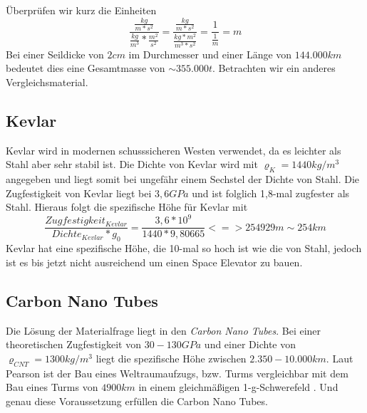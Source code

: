 \documentclass[a4paper, 10pt]{report}
\begin{document}
Überprüfen wir kurz die Einheiten
\begin{equation}
\frac{\frac{kg}{m*s^2}}{\frac{kg}{m^3}*\frac{m^2}{s^2}}= \frac{\frac{kg}{m*s^2}}{\frac{kg*m^2}{m^3*s^2}} = \frac{1}{\frac{1}{m}} = m
\end{equation}
Bei einer Seildicke von $2 cm$ im Durchmesser und einer Länge von $144.000 km$ bedeutet dies eine Gesamtmasse von $\sim 355.000 t$.\cite{PE75}
Betrachten wir ein anderes Vergleichsmaterial.
\subsection{Kevlar}
Kevlar wird in modernen schusssicheren Westen verwendet, da es leichter als Stahl aber sehr stabil ist. Die Dichte von Kevlar wird mit $\varrho_K = 1440 kg/m^3$ angegeben und liegt somit bei ungefähr einem Sechstel der Dichte von Stahl. Die Zugfestigkeit von Kevlar liegt bei $3,6 GPa$ und ist folglich 1,8-mal zugfester als Stahl. Hieraus folgt die spezifische Höhe für Kevlar mit
\begin{equation}
\frac{Zugfestigkeit_{Kevlar}}{Dichte_{Kevlar}*g_0} = \frac{3,6*10^9}{1440*9,80665}
<=> 254 929 m \sim 254 km 
\end{equation}
Kevlar hat eine spezifische Höhe, die 10-mal so hoch ist wie die von Stahl, jedoch ist es bis jetzt nicht ausreichend um einen Space Elevator zu bauen. \cite{PE75}
\subsection{Carbon Nano Tubes}
Die Lösung der Materialfrage liegt in den \textsl{Carbon Nano Tubes}.
Bei einer theoretischen Zugfestigkeit von $30 - 130 GPa$ und einer Dichte von $\varrho_{CNT} = 1300 kg/m^3$ liegt die spezifische Höhe zwischen $2.350 - 10.000 km$. Laut Pearson ist der Bau eines Weltraumaufzugs, bzw. Turms vergleichbar mit dem Bau eines Turms von $4900 km$ in einem gleichmäßigen 1-g-Schwerefeld \cite{PE75}. Und genau diese Voraussetzung erfüllen die Carbon Nano Tubes.
\end{document}

